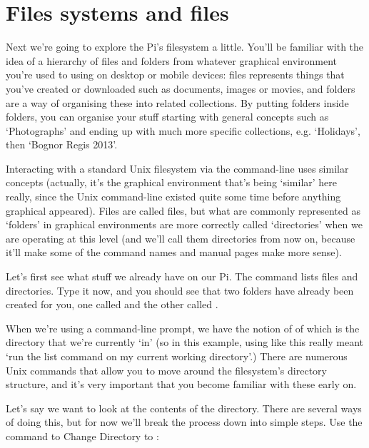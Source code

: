 \section{Files systems and files}

Next we're going to explore the Pi's filesystem a little. You'll be familiar with the idea of a hierarchy of files and folders from whatever graphical environment you're used to using on desktop or mobile devices: files represents things that you've created or downloaded such as documents, images or movies, and folders are a way of organising these into related collections. By putting folders inside folders, you can organise your stuff starting with general concepts such as `Photographs' and ending up with much more specific collections, e.g. `Holidays', then `Bognor Regis 2013'. 

Interacting with a standard Unix filesystem via the command-line uses similar concepts (actually, it's the graphical environment that's being `similar' here really, since the Unix command-line existed quite some time before anything graphical appeared). Files are called files, but what are commonly represented as `folders' in graphical environments are more correctly called `directories' when we are operating at this level (and we'll call them directories from now on, because it'll make some of the command names and manual pages make more sense). 

Let's first see what stuff we already have on our Pi. The  command lists files and directories. Type it now, and you should see that two folders have already been created for you, one called  and the other called . 



When we're using a command-line prompt, we have the notion of of  which is the directory that we're currently `in' (so in this example, using  like this really meant `run the list command on my current working directory'.) There are numerous Unix commands that allow you to move around the filesystem's directory structure, and it's very important that you become familiar with these early on. 

Let's say we want to look at the contents of the  directory. There are several ways of doing this, but for now we'll break the process down into simple steps. Use the  command to Change Directory to :

